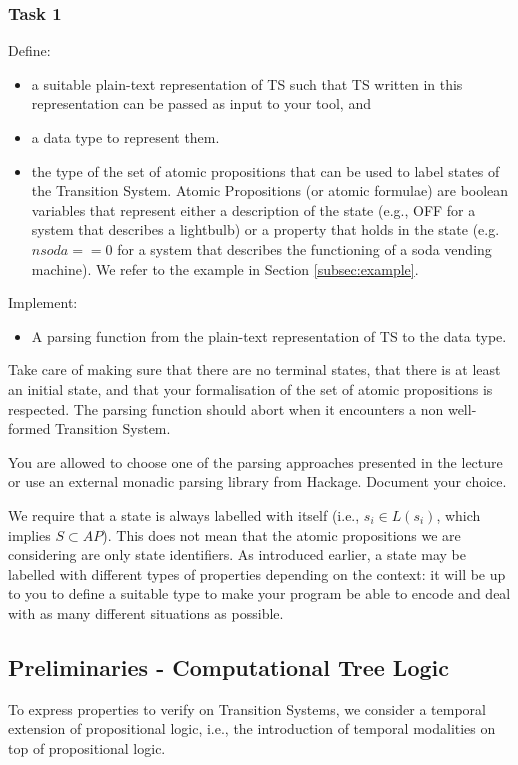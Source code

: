 \documentclass{article}
\begin{document}
\subsubsection*{Task 1}
Define:
\begin{itemize}
    \item a suitable plain-text representation of TS such that TS written in this representation
          can be passed as input to your tool, and
    \item a data type to represent them. 
    \item the type of the set of atomic propositions that can be used to label states of the Transition System. 
            Atomic Propositions (or atomic formulae) are boolean variables that represent either
            a description of the state (e.g., OFF for a system that describes a lightbulb) 
            or a property that holds in the state (e.g. $nsoda == 0$ for a system that describes the functioning 
            of a soda vending machine). We refer to the example in Section \ref{subsec:example}.
\end{itemize} 
Implement: 
\begin{itemize}
    \item A parsing function from the plain-text representation of TS to the data type.
\end{itemize}
Take care of making sure that there are no terminal states, that there is at least an initial state, 
and that your formalisation of the set of atomic propositions is respected. 
The parsing function should abort when it encounters a non well-formed Transition System.
\color{black}

You are allowed to choose one of the parsing approaches presented in the lecture or 
use an external monadic parsing library from Hackage. Document your choice.

We require that a state is always labelled with itself 
(i.e., $s_i \in L(s_i)$, which implies $S \subset AP$). This does not mean that the atomic propositions we are considering are only state identifiers. As introduced earlier, a state may be labelled with different types of properties depending on the context: it will be up to you to define a suitable type to make your program be able to encode and deal with as many different situations as possible.


\subsection{Preliminaries - Computational Tree Logic}
\label{subsec-ctl}
To express properties to verify on Transition Systems, we consider a temporal extension of propositional logic, 
i.e., the introduction of temporal modalities on top of propositional logic. 
\end{document}
